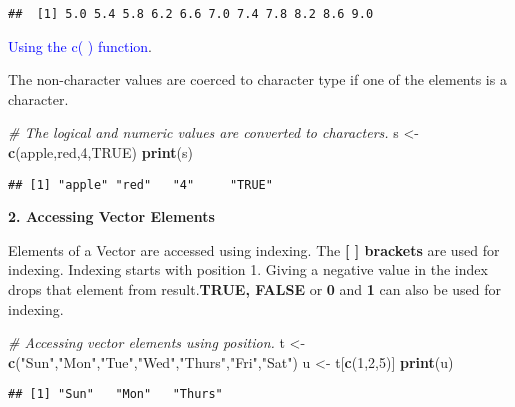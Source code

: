 \documentclass[
]{article}
\newenvironment{Shaded}{\begin{snugshade}}{\end{snugshade}}
\newcommand{\CommentTok}[1]{\textcolor[rgb]{0.56,0.35,0.01}{\textit{#1}}}
\newcommand{\ConstantTok}[1]{\textcolor[rgb]{0.56,0.35,0.01}{#1}}
\newcommand{\DecValTok}[1]{\textcolor[rgb]{0.00,0.00,0.81}{#1}}
\newcommand{\FunctionTok}[1]{\textcolor[rgb]{0.13,0.29,0.53}{\textbf{#1}}}
\newcommand{\NormalTok}[1]{#1}
\newcommand{\OtherTok}[1]{\textcolor[rgb]{0.56,0.35,0.01}{#1}}
\newcommand{\StringTok}[1]{\textcolor[rgb]{0.31,0.60,0.02}{#1}}
\begin{document}
\begin{verbatim}
##  [1] 5.0 5.4 5.8 6.2 6.6 7.0 7.4 7.8 8.2 8.6 9.0
\end{verbatim}

\textcolor{blue}{Using the c( ) function}.

The non-character values are coerced to character type if one of the
elements is a character.

\begin{Shaded}
\begin{Highlighting}[]
\CommentTok{\# The logical and numeric values are converted to characters.}
\NormalTok{s }\OtherTok{\textless{}{-}} \FunctionTok{c}\NormalTok{(}\StringTok{\textquotesingle{}apple\textquotesingle{}}\NormalTok{,}\StringTok{\textquotesingle{}red\textquotesingle{}}\NormalTok{,}\DecValTok{4}\NormalTok{,}\ConstantTok{TRUE}\NormalTok{)}
\FunctionTok{print}\NormalTok{(s)}
\end{Highlighting}
\end{Shaded}

\begin{verbatim}
## [1] "apple" "red"   "4"     "TRUE"
\end{verbatim}

\textbf{2. Accessing Vector Elements}

Elements of a Vector are accessed using indexing. The \textbf{{[} {]}
brackets} are used for indexing. Indexing starts with position 1. Giving
a negative value in the index drops that element from
result.\textbf{TRUE, FALSE} or \textbf{0} and \textbf{1} can also be
used for indexing.

\begin{Shaded}
\begin{Highlighting}[]
\CommentTok{\# Accessing vector elements using position.}
\NormalTok{t }\OtherTok{\textless{}{-}} \FunctionTok{c}\NormalTok{(}\StringTok{"Sun"}\NormalTok{,}\StringTok{"Mon"}\NormalTok{,}\StringTok{"Tue"}\NormalTok{,}\StringTok{"Wed"}\NormalTok{,}\StringTok{"Thurs"}\NormalTok{,}\StringTok{"Fri"}\NormalTok{,}\StringTok{"Sat"}\NormalTok{)}
\NormalTok{u }\OtherTok{\textless{}{-}}\NormalTok{ t[}\FunctionTok{c}\NormalTok{(}\DecValTok{1}\NormalTok{,}\DecValTok{2}\NormalTok{,}\DecValTok{5}\NormalTok{)]}
\FunctionTok{print}\NormalTok{(u)}
\end{Highlighting}
\end{Shaded}

\begin{verbatim}
## [1] "Sun"   "Mon"   "Thurs"
\end{verbatim}
\end{document}
